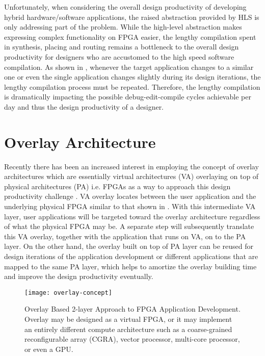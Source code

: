 Unfortunately, when considering the overall design productivity of developing hybrid hardware/software applications, the raised abstraction provided by HLS is only addressing part of the problem. While the high-level abstraction makes expressing complex functionality on FPGA easier, the lengthy compilation spent in synthesis, placing and routing remains a bottleneck to the overall design productivity for designers who are accustomed to the high speed software compilation. As shown in , whenever the target application changes to a similar one or even the single application changes slightly during its design iterations, the lengthy compilation process must be repeated. Therefore, the lengthy compilation is dramatically impacting the possible debug-edit-compile cycles achievable per day and thus the design productivity of a designer.  

\section{Overlay Architecture}
Recently there has been an increased interest in employing the concept of overlay architectures which are essentially virtual architectures (VA) overlaying on top of physical architectures (PA) i.e. FPGAs as a way to approach this design productivity challenge \cite{olaf2013, coole2010intermediate, lin2012energy, jain2015efficient, liu2015automatic, brant2012ZUMA, lebedev2010MARC, kissler2006dynamically, ferreira2011fpga, jeffrey2011potential, capalijia2013pipelined, koch2013efficient, coole2015adjustable, grant2011malibu}. VA overlay locates between the user application and the underlying physical FPGA similar to that shown in . With this intermediate VA layer, user applications will be targeted toward the overlay architecture regardless of what the physical FPGA may be. A separate step will subsequently translate this VA overlay, together with the application that runs on VA, on to the PA layer. On the other hand, the overlay built on top of PA layer can be reused for design iterations of the application development or different applications that are mapped to the same PA layer, which helps to amortize the overlay building time and improve the design productivity eventually.

\begin{figure}
\centering
\texttt{[image: overlay-concept]}
\caption{Overlay Based 2-layer Approach to FPGA Application Development. Overlay may be designed as a virtual FPGA, or it may implement an entirely different compute architecture such as a coarse-grained reconfigurable array (CGRA), vector processor, multi-core processor, or even a GPU.}
\label{fig:overlay-concept}
\end{figure}

